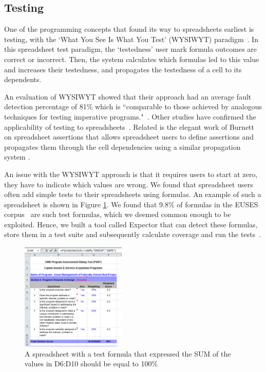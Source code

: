 \documentclass[conference]{IEEEtran}
\begin{document}
\subsection{Testing}
One of the programming concepts that found its way to spreadsheets earliest is testing, with the `What You See Is What You Test' (WYSIWYT) paradigm~\cite{Rothermel1997}. In this spreadsheet test paradigm, the `testedness' user mark formula outcomes are correct or incorrect. Then, the system calculates which formulas led to this value and increases their testedness, and propagates the testedness of a cell to its dependents.

An evaluation of WYSIWYT showed that their approach had an average fault detection percentage of 81\% which is ``comparable to those achieved by analogous techniques for testing imperative programs."~\cite{Rothermel2000}. Other studies have confirmed the applicability of testing to spreadsheets~\cite{Kruck2006}. Related is the elegant work of Burnett on spreadsheet assertions that allows spreadsheet users to define assertions and propagates them through the cell dependencies using a similar propagation system \cite{Burnett2003}.

An issue with the WYSIWYT approach is that it requires users to start at zero, they have to indicate which values are wrong. We found that spreadsheet users often add simple tests to their spreadsheets using formulas. An example of such a spreadsheet is shown in Figure \ref{fig:test-example}. We found that 9.8\% of formulas in the EUSES corpus~\cite{fisher_euses_2005} are such test formulas, which we deemed common enough to be exploited. Hence, we built a tool called Expector that can detect these formulas, store them in a test suite and subsequently calculate coverage and run the tests~\cite{Hermans2013-Cascon}.

\begin{figure}
  \begin{center}
  \includegraphics[width=5cm]{fig/test-example.png}
  \caption{A spreadsheet with a test formula that expressed the SUM of the values in D6:D10 should be equal to 100\%}
  \label{fig:test-example}
  \end{center}
\end{figure} 
\end{document}

